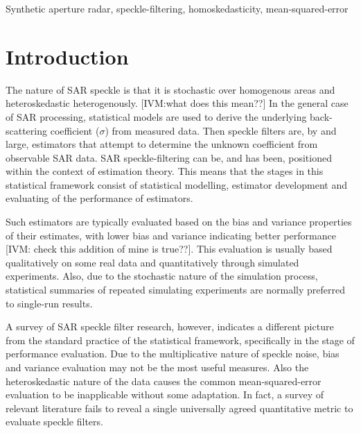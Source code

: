 \documentclass[journal]{IEEEtran}
\begin{document}
\begin{IEEEkeywords}
Synthetic aperture radar, speckle-filtering, homoskedasticity, mean-squared-error
\end{IEEEkeywords}


\IEEEpeerreviewmaketitle

\section{Introduction}

The nature of SAR speckle is that it is stochastic over homogenous areas and heteroskedastic heterogenously. 
[IVM:what does this mean??]
In the general case of SAR processing, statistical models are used to derive the underlying back-scattering coefficient ($\sigma$) from measured data. Then speckle filters are, by and large, estimators that attempt to determine the unknown coefficient from observable SAR data. 
SAR speckle-filtering can be, and has been, positioned within the context of estimation theory\cite{Touzi_2002_TGRS}. This means that the stages in this statistical framework consist of statistical modelling, estimator development and evaluating of the performance of estimators. 

Such estimators are typically evaluated based on the bias and variance properties of their estimates, with lower bias and variance indicating better performance [IVM: check this addition of mine is true??]. This evaluation is usually based qualitatively on some real data and quantitatively through simulated experiments. Also, due to the stochastic nature of the simulation process, statistical summaries of repeated simulating experiments are normally preferred to single-run results.

A survey of SAR speckle filter research, however, indicates a different picture from the standard practice of the statistical framework, specifically in the stage of performance evaluation. Due to the multiplicative nature of speckle noise, bias and variance evaluation may not be the most useful measures. Also the heteroskedastic nature of the data causes the common mean-squared-error evaluation to be inapplicable without some adaptation. In fact, a survey of relevant literature fails to reveal a single universally agreed quantitative metric to evaluate speckle filters.
\end{document}
